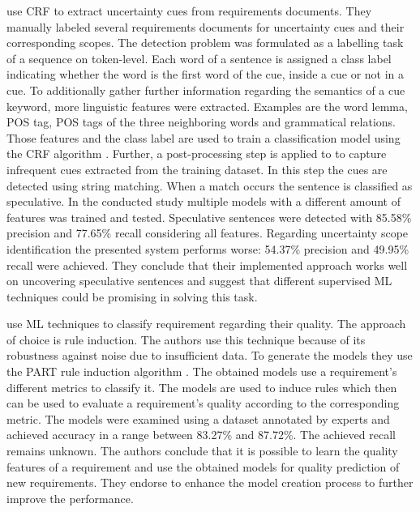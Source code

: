 \textcite{Yang:2012} use \ac{CRF} to extract uncertainty cues from requirements documents.
They manually labeled several requirements documents for uncertainty cues and their corresponding scopes.
The detection problem was formulated as a labelling task of a sequence on token-level.
Each word of a sentence is assigned a class label indicating whether the word is the first word of the cue, inside a cue or not in a cue.
To additionally gather further information regarding the semantics of a cue keyword, more linguistic features were extracted.
Examples are the word lemma, \ac{POS} tag, \ac{POS} tags of the three neighboring words and grammatical relations.
Those features and the class label are used to train a classification model using the \ac{CRF} algorithm \parencite{Lafferty:2001}.
Further, a post-processing step is applied to to capture infrequent cues extracted from the training dataset.
In this step the cues are detected using string matching.
When a match occurs the sentence is classified as speculative.
In the conducted study multiple models with a different amount of features was trained and tested.
Speculative sentences were detected with 85.58\% precision and 77.65\% recall considering all features.
Regarding uncertainty scope identification the presented system performs worse: 54.37\% precision and 49.95\% recall were achieved.
They conclude that their implemented approach works well on uncovering speculative sentences and suggest that different supervised \ac{ML} techniques could be promising in solving this task.

\textcite{Parra:2015} use \ac{ML} techniques to classify requirement regarding their quality.
The approach of choice is rule induction.
The authors use this technique because of its robustness against noise due to insufficient data.
To generate the models they use the PART rule induction algorithm \parencite{Eibe:1998}.
The obtained models use a requirement's different metrics to classify it.
The models are used to induce rules which then can be used to evaluate a requirement's quality according to the corresponding metric.
The models were examined using a dataset annotated by experts and achieved accuracy in a range between 83.27\% and 87.72\%.
The achieved recall remains unknown.
The authors conclude that it is possible to learn the quality features of a requirement and use the obtained models for quality prediction of new requirements.
They endorse to enhance the model creation process to further improve the performance.

